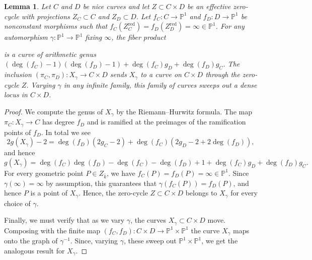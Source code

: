 \documentclass[a4paper,11pt]{amsart}
\theoremstyle{plain}
\newtheorem{lemma}[thm]{Lemma}
\theoremstyle{remark}
\renewcommand{\P}{\mathbb{P}}
\newcommand{\red}{\operatorname{red}}
\begin{document}
\begin{lemma}\label{lem:fiber_product_construction}
    Let \(C\) and \(D\) be nice curves and let \(Z \subset C \times D\) be an effective zero-cycle with projections \(Z_C \subset C\) and \(Z_D \subset D\).
    Let \(f_C \colon C \to \P^1\) and \(f_D \colon D \to \P^1\) be nonconstant morphisms such that \(f_C(Z_C^{\red}) = f_D(Z_D^{\red}) = \infty \in \P^1\).  For any automorphism \(\gamma \colon \P^1 \to \P^1\) fixing \(\infty\), the fiber product
\begin{center}
\end{center}
is a curve of arithmetic genus \((\deg(f_C) - 1)( \deg(f_D) -1) + \deg(f_C)g_D + \deg(f_D)g_C \).  The inclusion \((\pi_C, \pi_D) \colon X_\gamma \to C \times D\) sends \(X_\gamma\) to a curve on \(C \times D\) through the zero-cycle \(Z\).  Varying \(\gamma\) in any infinite  family, this family of curves sweeps out a dense locus in \(C \times D\).
\end{lemma} 
\begin{proof}
    We compute the genus of \(X_\gamma\) by the Riemann--Hurwitz formula.  The map \(\pi_C \colon X_\gamma \to C\) has degree \(f_D\) and is ramified at the preimages of the ramification points of \(f_D\).  In total we see
    \[2g(X_\gamma) - 2 = \deg(f_D)(2g_C - 2) + \deg(f_C)(2g_D - 2 + 2\deg(f_D)),\]
    and hence
    \[g(X_\gamma) = \deg(f_C) \deg(f_D)- \deg(f_C) - \deg(f_D) + 1 + \deg(f_C)g_D + \deg(f_D)g_C . \]
    For every geometric point \(P \in Z_{\bar{k}}\), we have \(f_C(P) = f_D(P) = \infty \in \P^1\).  Since \(\gamma(\infty) = \infty\) by assumption, this guarantees that \(\gamma(f_C(P)) = f_D(P)\), and hence \(P\) is a point of \(X_\gamma\).
    Hence, the zero-cycle \(Z \subset C \times D\) belongs to \(X_\gamma\) for every choice of \(\gamma\).  
    
    Finally, we must verify that as we vary \(\gamma\), the curves \(X_\gamma \subset C \times D\) move.  Composing with the finite map \((f_C, f_D) \colon C \times D \to \P^1 \times \P^1\) the curve \(X_\gamma\) maps onto the graph of \(\gamma^{-1}\).  Since, varying \(\gamma\), these sweep out \(\P^1 \times \P^1\), we get the analogous result for \(X_\gamma\).
\end{proof}
\end{document}
